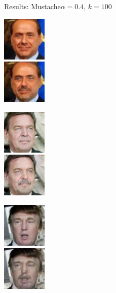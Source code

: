 \documentclass[11pt]{beamer}
\begin{document}
\begin{frame}{Results: Mustache}{$\alpha=0.4$, $k=100$}
	\centering
	\begin{minipage}{81px}
		\includegraphics[width=80px]{../pictures/outputs/start-imgs/Berlusconi.png}\\
		\includegraphics[width=80px]{../pictures/outputs/mustache_alpha0.4_k100/Berlusconi.png}
	\end{minipage}%
	\begin{minipage}{81px}
		\includegraphics[width=80px]{../pictures/outputs/start-imgs/Schroeder.png}\\
		\includegraphics[width=80px]{../pictures/outputs/mustache_alpha0.4_k100/Schroeder.png}
	\end{minipage}%
	\begin{minipage}{81px}
		\includegraphics[width=80px]{../pictures/outputs/start-imgs/Trump.png}\\
		\includegraphics[width=80px]{../pictures/outputs/mustache_alpha0.4_k100/Trump.png}

\end{minipage}
\end{frame}
\end{document}
